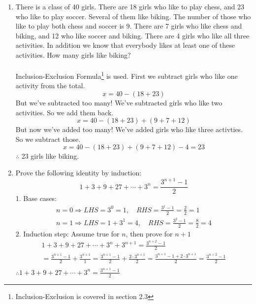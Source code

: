 \documentclass[10pt,a4paper,final]{article}
\begin{document}
\begin{enumerate}
\item %
There is a class of 40 girls. There are 18 girls who like to play chess, and 23 who like to play soccer.
Several of them like biking. The number of those who like to play both chess and soccer is 9.
There are 7 girls who like chess and biking, and 12 who like soccer and biking.
There are 4 girls who like all three activities.
In addition we know that everybody likes at least one of these activities. How many girls like biking?\\
\\
Inclusion-Exclusion Formula\footnote{Inclusion-Exclusion is covered in section 2.3} is used.
First we subtract girls who like one activity from the total.
\begin{equation*}
x = 40 - (18 + 23)
\end{equation*}
But we've subtracted too many! We've subtracted girls who like two activities.
So we add them back.
\begin{equation*}
x = 40 - (18 + 23) + (9 + 7 + 12)
\end{equation*}
But now we've added too many! We've added girls who like three activties.
So we subtract those.
\begin{equation*}
x = 40 - (18 + 23) + (9 + 7 + 12) - 4 = 23
\end{equation*}
$\therefore$ 23 girls like biking.

\item %
Prove the following identity by induction:
\begin{equation*}
1 + 3 + 9 + 27 + \cdots + 3^n = \frac{3^{n+1}-1}{2}
\end{equation*}
1. Base cases:\\
\begin{eqnarray*}
n = 0 \Rightarrow LHS = 3^0 = 1, \quad RHS = \frac{3^1-1}{2} = \frac{2}{2} = 1\\
n = 1 \Rightarrow LHS = 1 + 3^1 = 4, \quad RHS = \frac{3^2-1}{2} = \frac{8}{2} = 4
\end{eqnarray*}
2. Induction step: Assume true for $n$, then prove for $n+1$
\begin{eqnarray*}
1 + 3 + 9 + 27 + \cdots + 3^n + 3^{n+1} = \frac{3^{n+2}-1}{2}\\
= \frac{3^{n+1}-1}{2} + \frac{3^{n+1}}{1} = \frac{3^{n+1}-1}{2} + \frac{2 \cdot 3^{n+1}}{2}
= \frac{3^{n+1} - 1 + 2 \cdot 3^{n+1}}{2} = \frac{3^{n+2}-1}{2}\\
\end{eqnarray*}
$\therefore 1 + 3 + 9 + 27 + \cdots + 3^n = \frac{3^{n+1}-1}{2}$


\end{enumerate}
\end{document}
